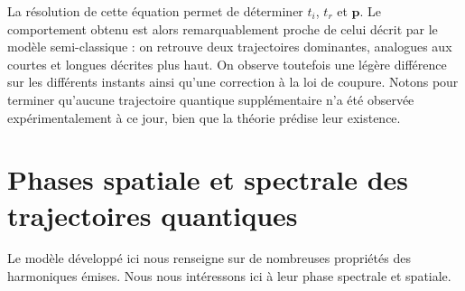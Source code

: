La résolution de cette équation permet de déterminer $t_i$, $t_r$ et $\bm{p}$. Le comportement obtenu est alors remarquablement proche de celui décrit par le modèle semi-classique : on retrouve deux trajectoires dominantes, analogues aux courtes et longues décrites plus haut. On observe toutefois une légère différence sur les différents instants ainsi qu'une correction à la loi de coupure. Notons pour terminer qu'aucune trajectoire quantique supplémentaire n'a été observée expérimentalement à ce jour, bien que la théorie prédise leur existence.

\section{Phases spatiale et spectrale des trajectoires quantiques}
\label{sec:thTraj}
Le modèle développé ici nous renseigne sur de nombreuses propriétés des harmoniques émises. Nous nous intéressons ici à leur phase spectrale et spatiale.

